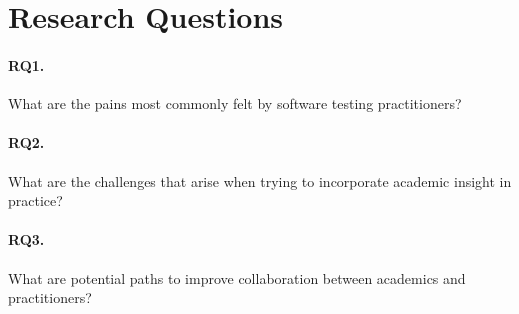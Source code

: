 \section{Research Questions}\label{sec:ind_rqs}


\paragraph{RQ1. } What are the pains most commonly felt by software testing practitioners?
\paragraph{RQ2. } What are the challenges that arise when trying to incorporate academic insight in practice?
\paragraph{RQ3. } What are potential paths to improve collaboration between academics and practitioners?
